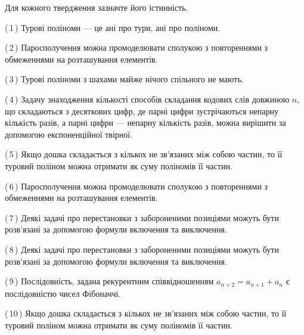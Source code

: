 \documentclass[12pt, ukrainian]{article}
\begin{document}
\begin {large}
\begin {large}
\begin {large}
\begin {large}
\begin {large}
\begin {large}
\begin {large}
\begin {large}
\begin {large}
\begin {large}
\begin {large}
\begin {large}
\begin {large}
\begin {large}
\begin {large}
\begin {large}
\begin {large}
\begin {large}
\begin {large}
\begin {large}
\begin {large}
\begin {large}
\begin {large}
\begin {large}
\begin {large}
\begin {large}
\begin {large}
\begin {large}
\begin {large}
\begin {large}
\begin {large}
\begin {large}
\begin {large}
\begin {large}
\begin {large}
\begin {large}
\begin {large}
{
Для кожного твердження зазначте його істинність.\par

\vspace{2mm}

(\,1\,) Турові поліноми --- це ані про тури, ані про поліноми.%



(\,2\,) Паросполучення можна промоделювати сполукою з повтореннями з обмеженнями на розташування елементів.%



(\,3\,) Турові поліноми з шахами майже нічого спільного не мають.%



(\,4\,) Задачу знаходження кількості способів складання кодових слів довжиною $n$, що складаються з десяткових цифр, де парні цифри зустрічаються непарну кількість разів, а парні цифри — непарну кількість разів, можна вирішити за допомогою експоненційної твірної.%



(\,5\,) Якщо дошка складається з кількох не зв’язаних між собою частин, то її туровий поліном можна отримати як суму поліномів її частин.%



(\,6\,) Паросполучення можна промоделювати сполукою з повтореннями з обмеженнями на розташування елементів.%



(\,7\,) Деякі задачі про перестановки з забороненими позиціями можуть бути розв’я\-за\-ні за допомогою формули включення та виключення.%



(\,8\,) Деякі задачі про перестановки з забороненими позиціями можуть бути розв’я\-за\-ні за допомогою формули включення та виключення.%



(\,9\,) Послідовність, задана рекурентним співвідношенням $a_{n+2}=a_{n+1}+a_{n}$ є послідовністю чисел Фібоначчі.%



(\,10\,) Якщо дошка складається з кількох не зв’язаних між собою частин, то її туровий поліном можна отримати як суму поліномів її частин.%




}
\end{large}
\end{large}
\end{large}
\end{large}
\end{large}
\end{large}
\end{large}
\end{large}
\end{large}
\end{large}
\end{large}
\end{large}
\end{large}
\end{large}
\end{large}
\end{large}
\end{large}
\end{large}
\end{large}
\end{large}
\end{large}
\end{large}
\end{large}
\end{large}
\end{large}
\end{large}
\end{large}
\end{large}
\end{large}
\end{large}
\end{large}
\end{large}
\end{large}
\end{large}
\end{large}
\end{large}
\end{large}
\end{document}
